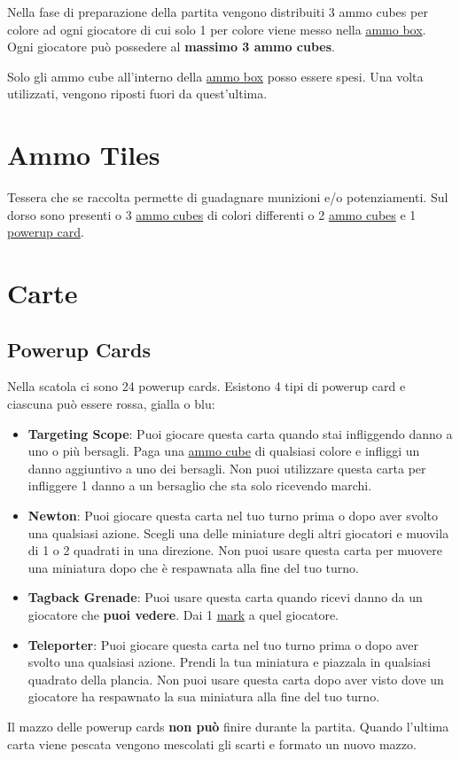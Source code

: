 \documentclass[a4paper, 12pt]{article}
\begin{document}
	Nella fase di preparazione della partita vengono distribuiti 3 ammo cubes per colore ad ogni giocatore di cui solo 1 per colore viene messo nella \hyperref[sec:ammo-box]{ammo box}.
	Ogni giocatore può possedere al \textbf{massimo 3 ammo cubes}.
	
	Solo gli ammo cube all'interno della \hyperref[sec:ammo-box]{ammo box} posso essere spesi. Una volta utilizzati, vengono riposti fuori da quest'ultima.
	
\section{Ammo Tiles} \label{sec:ammo-tiles}
	Tessera che se raccolta permette di guadagnare munizioni e/o potenziamenti. Sul dorso sono presenti o 3 \hyperref[sec:ammo-cubes]{ammo cubes} di colori differenti o 2  \hyperref[sec:ammo-cubes]{ammo cubes} e 1 \hyperref[sec:powerup-cards]{powerup card}.
\section{Carte}
	\subsection{Powerup Cards} \label{sec:powerup-cards}
		Nella scatola ci sono 24 powerup cards. Esistono 4 tipi di powerup card e ciascuna può essere rossa, gialla o blu:
		\begin{itemize}
			\item \textbf{Targeting Scope}: Puoi giocare questa carta quando stai infliggendo danno a uno o più bersagli. 
			Paga una \hyperref[sec:ammo-cubes]{ammo cube} di qualsiasi colore e infliggi un danno aggiuntivo a uno dei bersagli. 
			Non puoi utilizzare questa carta per infliggere 1 danno a un bersaglio che sta solo ricevendo marchi.
			\item \textbf{Newton}: Puoi giocare questa carta nel tuo turno prima o dopo aver svolto una qualsiasi azione.
			Scegli una delle miniature degli altri giocatori e muovila di 1 o 2 quadrati in una direzione. 
			Non puoi usare questa carta per muovere una miniatura dopo che è respawnata alla fine del tuo turno.
			\item \textbf{Tagback Grenade}: Puoi usare questa carta quando ricevi danno da un giocatore che \textbf{puoi vedere}.
			Dai 1 \hyperref[sec:mark]{mark} a quel giocatore.
			\item \textbf{Teleporter}: Puoi giocare questa carta nel tuo turno prima o dopo aver svolto una qualsiasi azione.
			Prendi la tua miniatura e piazzala in qualsiasi quadrato della plancia.
			Non puoi usare questa carta dopo aver visto dove un giocatore ha respawnato la sua miniatura alla fine del tuo turno.
		\end{itemize}
		Il mazzo delle powerup cards \textbf{non può} finire durante la partita. 
		Quando l'ultima carta viene pescata vengono mescolati gli scarti e formato un nuovo mazzo. 
		
\end{document}
